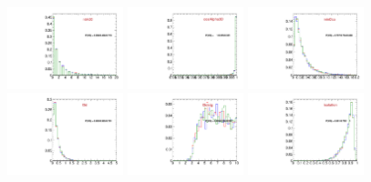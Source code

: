 \begin{figure}
  \centering
  \includegraphics[width=0.3\textwidth]{Figures/VariablesComparison/MC_endcaps_figs_3h/ntrk20}
  \includegraphics[width=0.3\textwidth]{Figures/VariablesComparison/MC_endcaps_figs_3h/cosAlpha3D}
  \includegraphics[width=0.3\textwidth]{Figures/VariablesComparison/MC_endcaps_figs_3h/minDca}
  \includegraphics[width=0.3\textwidth]{Figures/VariablesComparison/MC_endcaps_figs_3h/l3d}
  \includegraphics[width=0.3\textwidth]{Figures/VariablesComparison/MC_endcaps_figs_3h/l3dsig}
  \includegraphics[width=0.3\textwidth]{Figures/VariablesComparison/MC_endcaps_figs_3h/isolation}

\end{figure}
